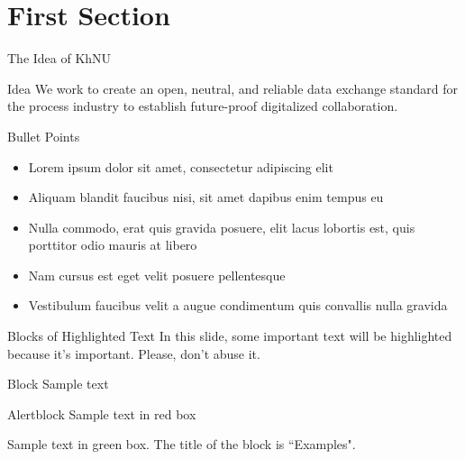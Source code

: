 \documentclass[aspectratio=169,xcolor=dvipsnames]{beamer}
\begin{document}
\section{First Section}
\begin{frame}{The Idea of KhNU}
\begin{block}{Idea}
    We work to create an open, neutral, and reliable data exchange standard for the process industry to establish future-proof digitalized collaboration.   
\end{block}
\end{frame}


\begin{frame}{Bullet Points}
    \begin{itemize}
        \item Lorem ipsum dolor sit amet, consectetur adipiscing elit
        \item Aliquam blandit faucibus nisi, sit amet dapibus enim tempus eu
        \item Nulla commodo, erat quis gravida posuere, elit lacus lobortis est, quis porttitor odio mauris at libero
        \item Nam cursus est eget velit posuere pellentesque
        \item Vestibulum faucibus velit a augue condimentum quis convallis nulla gravida
    \end{itemize}
\end{frame}


\begin{frame}{Blocks of Highlighted Text}
    In this slide, some important text will be \alert{highlighted} because it's important. Please, don't abuse it.

    \begin{block}{Block}
        Sample text
    \end{block}

    \begin{alertblock}{Alertblock}
        Sample text in red box
    \end{alertblock}

    \begin{examples}
        Sample text in green box. The title of the block is ``Examples".
    \end{examples}
\end{frame}
\end{document}
